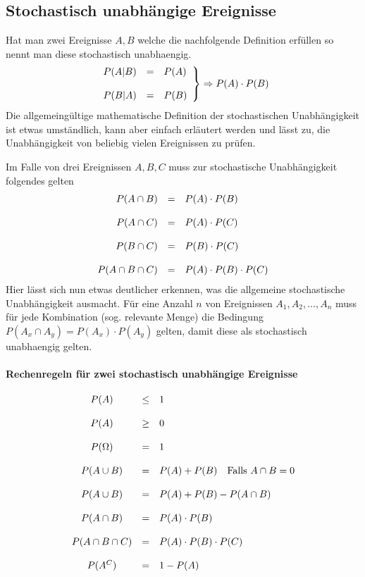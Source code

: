 \subsection{Stochastisch unabhängige Ereignisse}
Hat man zwei Ereignisse $A,B$ welche die nachfolgende Definition erfüllen
so nennt man diese \gls{stochastisch unabhaengig}.
\[ \left. 
	\begin{array}{l c l}
		P(A|B)
			& =
			& P(A) \\
		& & \\
		P(B|A)
			& =
			& P(B) \\
	\end{array} \right\}
	\Rightarrow P(A) \cdot P(B)
\]
Die allgemeingültige mathematische Definition der stochastischen 
Unabhängigkeit ist
etwas umständlich, kann aber einfach erläutert werden und lässt zu,
die Unabhängigkeit von beliebig vielen Ereignissen zu prüfen.

Im Falle von drei Ereignissen $A,B,C$ muss zur stochastische
Unabhängigkeit folgendes gelten
\[ \begin{array}{r c l}
	P(A \cap B)
		& = 
		& P(A) \cdot P(B) \\
	& & \\
	P(A \cap C)
		& =
		& P(A) \cdot P(C) \\
	& & \\
	P(B \cap C)
		& =
		& P(B) \cdot P(C) \\
	& & \\
	P(A \cap B \cap C)
		& =
		& P(A) \cdot P(B) \cdot P(C)
\end{array} \]
Hier lässt sich nun etwas deutlicher erkennen, was die allgemeine
stochastische Unabhängigkeit ausmacht. 
Für eine Anzahl $n$ von Ereignissen 
$A_1, A_2, \dots , A_n $ 
muss für jede Kombination (sog. relevante Menge) die Bedingung
$P(A_x \cap A_y) = P(A_x) \cdot P(A_y)$ gelten, damit diese
als \gls{stochastisch unabhaengig} gelten. 

\paragraph{Rechenregeln für zwei stochastisch unabhängige Ereignisse}
\[ \begin{array}{c c l}
	P(A)	
		& \leq
		& 1 \\
	& & \\
	P(A) 
		& \geq 
		& 0 \\
	& & \\
	P(\Omega) 
		& = 
		& 1 \\
	& & \\
	P(A \cup B) 
		& = 
		& P(A) + P(B) \quad \text{Falls } A \cap B = 0 \\
	& & \\
	P(A \cup B) 
		& = 
		& P(A) + P(B) - P(A \cap B) \\
	& & \\
	P(A \cap B) 
		& = 
		& P(A) \cdot P(B) \\
	& & \\
	P(A \cap B \cap C) 
		& = 
		& P(A) \cdot P(B) \cdot P(C) \\
	& & \\
	P(A^C) 
		& = 
		& 1 - P(A)
\end{array} \]
	
